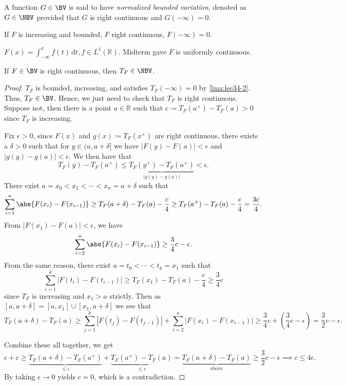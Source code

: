\begin{definition}\label{def:normalized-bounded-variation}
	A function \(G \in\BV\) is said to have \emph{normalized bounded variation}, denoted as \(G \in \NBV\) provided that \(G\) is right continuous and \(G(-\infty) = 0\).
\end{definition}

\begin{eg}
	If \(F\) is increasing and bounded, \(F\) right continuous, \(F(-\infty) = 0\).

	\(F(x) = \int_{-\infty}^x f(t) \,\mathrm{d}t, f \in L^1(\mathbb{R})\). Midterm gave \(F\) is uniformly continuous.
\end{eg}

\begin{lemma}
	If \(F \in\BV\) is right continuous, then \(T_F \in \NBV\).
\end{lemma}
\begin{proof}
	\(T_F\) is bounded, increasing, and satisfies \(T_F(-\infty) = 0\) by \autoref{lma:lec34-2}. Thus, \(T_F \in\BV\).
	Hence, we just need to check that \(T_F\) is right continuous. Suppose not, then there is a point \(a \in \mathbb{R}\) such that \(c \coloneqq T_F(a^+) - T_F(a) > 0\)
	since \(T_{F} \) is increasing.

	Fix \(\epsilon > 0\), since \(F(x)\) and \(g(x) \coloneqq T_F(x^+)\) are right continuous, there exists a \(\delta > 0\) such that for \(y \in (a,a+\delta]\) we have
	\(\left\vert F(y) - F(a) \right\vert < \epsilon\) and \(\left\vert g(y) - g(a) \right\vert < \epsilon\). We then have that
	\[
		T_F(y) - T_F(a^+) \leq \underbrace{T_F(y^+) - T_F(a^+)}_{\left\vert g(y) - g(a) \right\vert } < \epsilon.
	\]
	There exist \(a = x_0 < x_1 < \cdots < x_n = a + \delta\) such that
	\[
		\sum_{i=1}^n \abs{F(x_i) - F(x_{i-1})}  \geq T_F(a + \delta) - T_F(a) - \frac{c}{4} \geq T_F(a^+) - T_F(a) - \frac{c}{4} = \frac{3c}{4}.
	\]
	From \(\left\vert F(x_1) - F(a) \right\vert < \epsilon \), we have
	\[
		\sum_{i=2}^n \abs{F(x_i) - F(x_{i-1})} \geq \frac{3}{4}c - \epsilon.
	\]
	From the same reason, there exist \(a = t_0 < \cdots < t_k = x_1\) such that
	\[
		\sum_{i=1}^k \left\vert F(t_i) - F(t_{i-1}) \right\vert \geq T_F(x_1) - T_F(a) - \frac{c}{4} \geq \frac{3}{4}c
	\]
	since \(T_{F} \) is increasing and \(x_1 > a\) strictly. Then as \([a,a+\delta] = [a,x_1] \cup [x_1,a+\delta]\) we see that
	\[
		T_F(a + \delta) - T_F(a) \geq \sum_{j=1}^k \left\vert F(t_j) - F(t_{j-1}) \right\vert + \sum_{i=2}^n \left\vert F(x_i) - F(x_{i-1}) \right\vert \geq \frac{3}{4}c + \left(\frac{3}{4}c - \epsilon\right)= \frac{3}{2}c - \epsilon.
	\]

	Combine these all together, we get
	\[
		\epsilon + c  \geq \underbrace{T_F(a + \delta) - T_F(a^+)}_{\leq \epsilon} + \underbrace{T_F(a^+) - T_F(a)}_{\leq c} = \underbrace{T_F(a + \delta) - T_F(a)}_{\text{above}} \geq \frac{3}{2}c - \epsilon
		\implies c \leq 4 \epsilon.
	\]
	By taking \(\epsilon \to 0\) yields \(c = 0\), which is a contradiction.
\end{proof}

